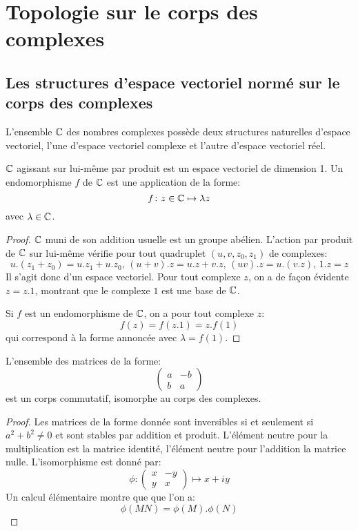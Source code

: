 \chapter{Topologie sur le corps des complexes}
\section{Les structures d'espace vectoriel normé sur le corps des complexes}

L'ensemble $\mathbb{C}$ des nom\-bres complexes possède deux structures naturelles d'espace vectoriel, l'une d'espace vectoriel complexe et l'autre d'espace vectoriel réel. 
\begin{fprop}
$\mathbb{C}$ agissant sur lui-même par produit est un espace vectoriel de dimension 1. Un endomorphisme $f$ de $\mathbb{C}$ est une application de la forme:
\[
f \colon z \in \mathbb{C} \mapsto \lambda z
\]
avec $\lambda \in \mathbb{C}$.
\end{fprop}
\begin{proof}
$\mathbb{C}$ muni de son addition usuelle est un groupe abélien. L'action par produit de $\mathbb{C}$ sur lui-même vérifie pour tout quadruplet $(u,v,z_0,z_1)$ de complexes:
\[
u.(z_1 + z_0) = u.z_1 + u.z_0, \, (u+v).z = u.z+ v.z, \, (uv).z = u.(v.z), \, 1. z = z
\]
Il s'agit donc d'un espace vectoriel. Pour tout complexe $z$, on a de façon évidente $z = z . 1$, montrant que le complexe $1$ est une base de $\mathbb{C}$.

Si $f$ est un endomorphisme de $\mathbb{C}$, on a pour tout complexe $z$:
\[
f(z) = f(z.1)=z.f(1)
\]
qui correspond à la forme annoncée avec $\lambda = f(1)$.
\end{proof}
\begin{fprop}
\label{prop:corps_matrices}
L'ensemble des matrices de la forme:
\[
\left(
\begin{array}{cc}
a   &  -b \\
b     & a
\end{array}
\right)
\]
est un corps commutatif, isomorphe au corps des complexes.
\end{fprop}
\begin{proof}
Les matrices de la forme donnée sont inversibles si et seulement si $a^2+b^2 \neq 0$ et sont stables par addition et produit. L'élément neutre pour la multiplication est la matrice identité, l'élément neutre pour l'addition la matrice nulle.
L'isomorphisme est donné par:
\[
\phi \colon 
\begin{pmatrix}
x   &  -y \\
y     & x
\end{pmatrix} \mapsto x + i y
\]
Un calcul élémentaire montre que que l'on a:
\[
\phi(MN) = \phi(M).\phi(N)
\]
\end{proof}
